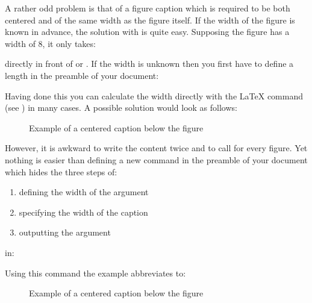 \begin{Example}
  A rather odd problem is that of a figure caption which is required
  to be both centered and of the same width as the figure itself. If
  the width of the figure is known in advance, the solution with
  {\KOMAScript} is quite easy. Supposing the figure has a width of
  8, it only takes:
\begin{lstcode}
  \setcapwidth[c]{8cm}
\end{lstcode}
directly in front of  or . If the
width is unknown then you first have to define a length in the
preamble of your document:
\begin{lstcode}
  \newlength{\FigureWidth}
\end{lstcode}
  Having done this you can calculate the width directly with the
  {\LaTeX} command  (see \cite{latex:usrguide})
 in many cases. A possible solution would look as follows:
\begin{lstcode}
  \begin{figure}
    \centering%
    \settowidth{\FigureWidth}{%
      \fbox{\quad\KOMAScript\quad}%
      }%
    \fbox{\quad\KOMAScript\quad}%
    \setcapwidth[c]{\FigureWidth}
    \caption{Example of a centered caption below the figure}
  \end{figure}
\end{lstcode}
However, it is awkward to write the content twice and to call
 for every figure. Yet nothing is easier than
defining a new command in the preamble of your document which hides
the three steps of:
  \begin{enumerate}
  \item defining the width of the argument
  \item specifying the width of the caption
  \item outputting the argument
  \end{enumerate}
  in:
\begin{lstcode}
  \newcommand{\Figure}[1]{%
    \settowidth{\FigureWidth}{#1}%
    \setcapwidth[c]{\FigureWidth}%
    #1}
\end{lstcode}
  Using this command the example abbreviates to:
\begin{lstcode}
  \begin{figure}
    \centering%
    \Figure{\fbox{\quad\KOMAScript\quad}}%
    \caption{Example of a centered caption below the figure}
  \end{figure}
\end{lstcode}
  

\end{Example}
